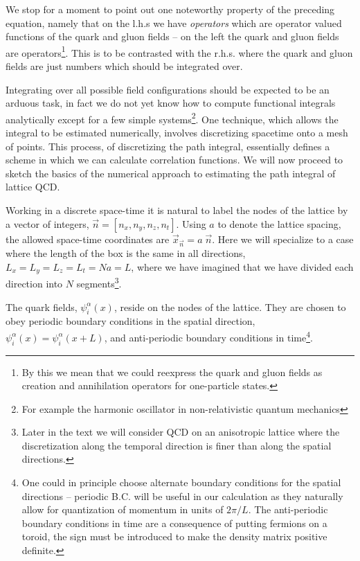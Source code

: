 We stop for a moment to point out one noteworthy property of the preceding equation, namely that on the l.h.s we have \emph{operators} which are operator valued functions of the quark and gluon fields -- on the left the quark and gluon fields are operators\footnote{By this we mean that we could reexpress the quark and gluon fields as creation and annihilation operators for one-particle states.}. This is to be contrasted with the r.h.s. where the quark and gluon fields are just numbers which should be integrated over.  

Integrating over all possible field configurations should be expected to be an arduous task, in fact we do not yet know how to compute  functional integrals analytically except for a few simple systems\footnote{For example the harmonic oscillator in non-relativistic quantum mechanics}. One technique, which allows the integral to be estimated numerically, involves discretizing spacetime onto a mesh of points. This process, of discretizing the path integral, essentially defines a scheme in which we can calculate correlation functions. We will now proceed to sketch the basics of the numerical approach to estimating the path integral of lattice QCD.  

Working in a discrete space-time it is natural to label the nodes of the lattice by a vector of integers, $\vec{n} = [n_x , n_y , n_z , n_t]$. Using $a$ to denote the lattice spacing, the allowed space-time coordinates are $\vec{x}_{\vec{n}} = a\;\vec{n}$. Here we will specialize to a case where the length of the box is the same in all directions, $L_{x}= L_{y} = L_z = L_t = N a = L$, where we have imagined that we have divided each direction into $N$ segments\footnote{Later in the text we will consider QCD on an anisotropic lattice where the discretization along the temporal direction is finer than along the spatial directions.}. 

The quark fields, $\psi^\alpha_i(x)$, reside on the nodes of the lattice. They are chosen to obey periodic boundary conditions in the spatial direction,  $\psi^\alpha_i(x) = \psi^\alpha_i(x + L)$, and anti-periodic boundary conditions in time\footnote{One could in principle choose alternate boundary conditions for the spatial directions -- periodic B.C. will be useful in our calculation as they naturally allow for quantization of momentum in units of $2\pi/L$. The anti-periodic boundary conditions in time are a consequence of putting fermions on a toroid, the sign must be introduced to make the density matrix positive definite.}. 

